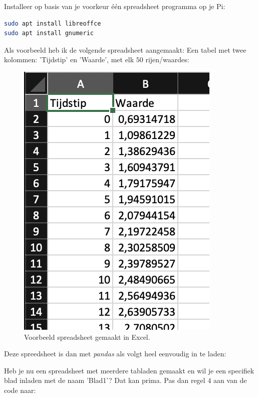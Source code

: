 \begin{exercise}
Installeer op basis van je voorkeur één spreadsheet programma op je Pi:
\begin{lstlisting}[language=bash]
sudo apt install libreoffce
sudo apt install gnumeric
\end{lstlisting}
\end{exercise}

Als voorbeeld heb ik de volgende spreadsheet aangemaakt: Een tabel met twee kolommen: 'Tijdstip' en 'Waarde', met elk $50$ rijen/waardes: 
\begin{figure}[h!]
\centering\includegraphics[scale=0.5]{Pictures/chapter07/excel1.png}
\caption{Voorbeeld spreadsheet gemaakt in Excel.}
\label{fig:excel1} %
\end{figure}

\newpage

Deze spreedsheet is dan met \textit{pandas} als volgt heel eenvoudig in te laden:

\begin{remark}
Heb je nu een spreadsheet met meerdere tabladen gemaakt en wil je een specifiek blad inladen met de naam 'Blad1'? Dat kan prima. Pas dan regel $4$ aan van de code naar: \\
\end{remark}

